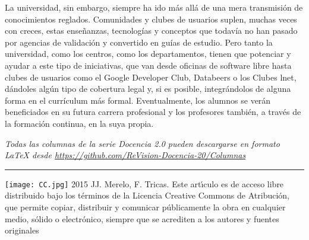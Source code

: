 \documentclass[twoside,10pt]{article}
\begin{document}
\begin{multicols}{2}
La universidad, sin embargo, siempre ha ido m\'as all\'a de una mera
transmisi\'on de conocimientos reglados. Comunidades y clubes de
usuarios suplen, muchas veces con creces, estas ense\~nanzas,
tecnolog\'ias y conceptos que todav\'ia no han pasado por agencias de
validaci\'on y convertido en gu\'ias de estudio. Pero tanto la
universidad, como los centros, como los departamentos, tienen que
potenciar y ayudar a este tipo de iniciativas, que van desde oficinas
de software libre hasta clubes de usuarios como el Google Developer
Club, Databeers o los Clubes lnet, d\'andoles alg\'un tipo de cobertura
legal y, si es posible, integr\'andolos de alguna forma en el curr\'iculum
m\'as formal. Eventualmente, los alumnos se ver\'an beneficiados en su
futura carrera profesional y los profesores tambi\'en, a trav\'es de la
formaci\'on continua, en la suya propia. 

\bigskip

\noindent\emph{Todas las columnas de la serie Docencia 2.0
pueden descargarse en formato LaTeX desde
{\small\url{https://github.com/ReVision-Docencia-20/Columnas}}}

\noindent\rule{90mm}{1pt}

{\small \noindent\texttt{[image: CC.jpg]} 2015 JJ. Merelo, F. Tricas. Este art\'{\i}culo es de acceso libre distribuido bajo los t\'erminos
de la Licencia Creative Commons de Atribuci\'on, que permite copiar,
distribuir y comunicar p\'ublicamente la obra en cualquier medio, s\'olido
o electr\'onico, siempre que se acrediten a los autores y fuentes
originales}

\end{multicols}
\end{document}
